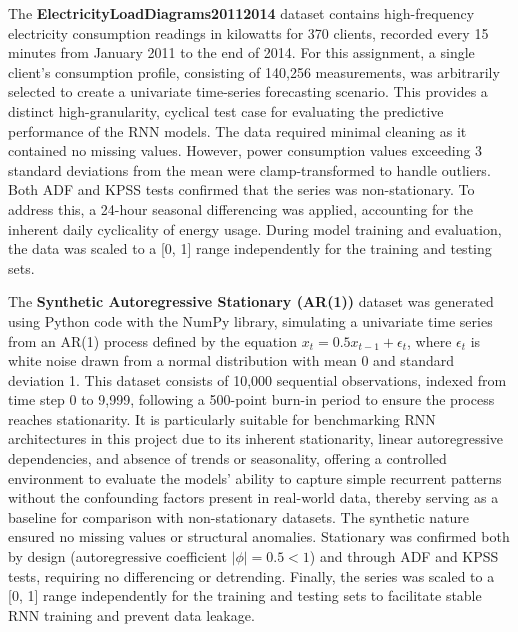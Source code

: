 \documentclass[conference, 10pt]{IEEEtran}
\begin{document}
The \textbf{ElectricityLoadDiagrams20112014} dataset contains high-frequency electricity consumption readings in
kilowatts for 370 clients, recorded every 15 minutes from January 2011 to the end of 2014. For this assignment, a single
client's consumption profile, consisting of 140,256 measurements, was arbitrarily selected to create a univariate
time-series forecasting scenario. This provides a distinct high-granularity, cyclical test case for evaluating the
predictive performance of the RNN models. The data required minimal cleaning as it contained no missing values. However,
power consumption values exceeding 3 standard deviations from the mean were clamp-transformed to handle outliers. Both
ADF and KPSS tests confirmed that the series was non-stationary. To address this, a 24-hour seasonal differencing was
applied, accounting for the inherent daily cyclicality of energy usage. During model training and evaluation, the data
was scaled to a [0, 1] range independently for the training and testing sets.

The \textbf{Synthetic Autoregressive Stationary (AR(1))} dataset was generated using Python code with the NumPy library,
simulating a univariate time series from an AR(1) process defined by the equation $x_t = 0.5 x_{t-1} + \epsilon_t$,
where $\epsilon_t$ is white noise drawn from a normal distribution with mean 0 and standard deviation 1. This dataset
consists of 10,000 sequential observations, indexed from time step 0 to 9,999, following a 500-point burn-in period to
ensure the process reaches stationarity. It is particularly suitable for benchmarking RNN architectures in this project
due to its inherent stationarity, linear autoregressive dependencies, and absence of trends or seasonality, offering a
controlled environment to evaluate the models' ability to capture simple recurrent patterns without the confounding
factors present in real-world data, thereby serving as a baseline for comparison with non-stationary datasets. The
synthetic nature ensured no missing values or structural anomalies. Stationary was confirmed both by design
(autoregressive coefficient $|\phi| = 0.5 < 1$) and through ADF and KPSS tests, requiring no differencing or detrending.
Finally, the series was scaled to a [0, 1] range independently for the training and testing sets to facilitate stable
RNN training and prevent data leakage.
\end{document}
